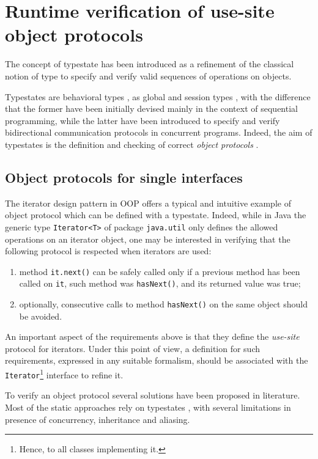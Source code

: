 \section{Runtime verification of use-site object protocols}\label{use-site}

The concept of typestate \cite{StromYemini86,GarciaTWA14} has been introduced as a refinement of the classical notion of type to specify and verify valid sequences of operations on objects.

Typestates are behavioral types \cite{AnconaBB0CDGGGH16}, as global \cite{CarboneHY07} and session types \cite{Honda93}, with the difference that the former have been initially devised mainly in the context of sequential programming, while the latter have been introduced to specify and verify bidirectional communication protocols in concurrent programs. Indeed, the aim of typestates is the definition and checking of correct \emph{object protocols} \cite{BacchianiBGMR22}.

\subsection{Object protocols for single interfaces}\label{iterator}
The iterator design pattern in OOP offers a typical and intuitive example of object protocol which can be defined with a typestate. Indeed, while in Java the generic type \lstinline{Iterator<T>} of package \lstinline|java.util| only defines the allowed operations on an iterator object, one may be interested in verifying that the following protocol is respected when iterators are used:
\begin{enumerate}
 \item method \lstinline|it.next()| can be safely called only if a previous method has been called on \lstinline{it}, such method was \lstinline|hasNext()|, and its returned value was true;
 \item optionally, consecutive calls to method \lstinline|hasNext()| on the same object should be avoided.
\end{enumerate}

An important aspect of the requirements above is that they define the \emph{use-site} protocol for iterators. Under this point of view, a definition  for such requirements, expressed in any suitable formalism, should be associated with the \lstinline|Iterator|\footnote{Hence, to all classes implementing it.} interface to refine it.

To verify an object protocol several solutions have been proposed in literature.
Most of the static approaches rely on typestates \cite{KouzapasDPG18,VoineaDG20,MotaGR21,BacchianiBGMR22}, with several limitations in presence of concurrency, inheritance and aliasing.

